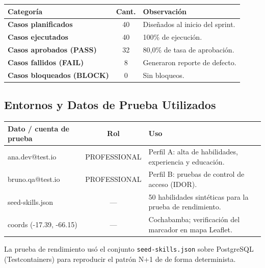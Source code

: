\vspace{0.1cm}
\noindent
\renewcommand{\arraystretch}{1.35}
\fontsize{8.5}{10.2}\selectfont\sffamily
\begin{tabularx}{\textwidth}{|>{\bfseries\color{colorPrimario}}p{4.6cm}|c|Y|}
\hline
{}
\sffamily\textbf{Categoría} & \sffamily\textbf{Cant.} & \sffamily\textbf{Observación} \\
\hline
Casos planificados & 40 & Diseñados al inicio del sprint. \\ \hline
{}
Casos ejecutados & 40 & 100\% de ejecución. \\ \hline
Casos aprobados (PASS) & 32 & 80,0\% de tasa de aprobación. \\ \hline
{}
Casos fallidos (FAIL) & 8 & Generaron reporte de defecto. \\ \hline
Casos bloqueados (BLOCK) & 0 & Sin bloqueos. \\ \hline
\end{tabularx}

\vspace{0.3cm}

\subsection{Entornos y Datos de Prueba Utilizados}
\label{sec:s2-datos}

\vspace{0.1cm}
\noindent
\renewcommand{\arraystretch}{1.3}
\fontsize{8.5}{10.2}\selectfont\sffamily
\begin{tabularx}{\textwidth}{|>{\ttfamily}p{4.6cm}|c|Y|}
\hline
{}
\sffamily\textbf{Dato / cuenta de prueba} & \sffamily\textbf{Rol} & \sffamily\textbf{Uso} \\
\hline
ana.dev@test.io & PROFESSIONAL & Perfil A: alta de habilidades, experiencia y educación. \\ \hline
{}
bruno.qa@test.io & PROFESSIONAL & Perfil B: pruebas de control de acceso (IDOR). \\ \hline
seed-skills.json & — & 50 habilidades sintéticas para la prueba de rendimiento. \\ \hline
{}
coords (-17.39, -66.15) & — & Cochabamba; verificación del marcador en mapa Leaflet. \\ \hline
\end{tabularx}

\begin{NotaTecnica}
La prueba de rendimiento  usó el conjunto \texttt{seed-skills.json} sobre
PostgreSQL (Testcontainers) para reproducir el patrón N+1 de  de forma
determinista.
\end{NotaTecnica}

